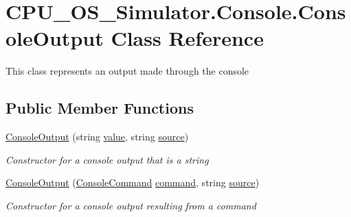 \hypertarget{class_c_p_u___o_s___simulator_1_1_console_1_1_console_output}{}\section{C\+P\+U\+\_\+\+O\+S\+\_\+\+Simulator.\+Console.\+Console\+Output Class Reference}
\label{class_c_p_u___o_s___simulator_1_1_console_1_1_console_output}


This class represents an output made through the console  


\subsection*{Public Member Functions}
\begin{DoxyCompactItemize}
\item 
\hyperlink{class_c_p_u___o_s___simulator_1_1_console_1_1_console_output_a8d641979b1d7dee40a2f4a4088f3779f}{Console\+Output} (string \hyperlink{class_c_p_u___o_s___simulator_1_1_console_1_1_console_output_a3bc577f947d51bc1b5c3880d5a7d5158}{value}, string \hyperlink{class_c_p_u___o_s___simulator_1_1_console_1_1_console_output_a3873d00cdb36068d1108fb012857504a}{source})
\begin{DoxyCompactList}\small\item\em Constructor for a console output that is a string \end{DoxyCompactList}\item 
\hyperlink{class_c_p_u___o_s___simulator_1_1_console_1_1_console_output_a26f0d6c6aa1f94d28171ee61c9ae4183}{Console\+Output} (\hyperlink{class_c_p_u___o_s___simulator_1_1_console_1_1_console_command}{Console\+Command} \hyperlink{class_c_p_u___o_s___simulator_1_1_console_1_1_console_output_aef6097d68fb3e2e83043c3857fdb8d56}{command}, string \hyperlink{class_c_p_u___o_s___simulator_1_1_console_1_1_console_output_a3873d00cdb36068d1108fb012857504a}{source})
\begin{DoxyCompactList}\small\item\em Constructor for a console output resulting from a command \end{DoxyCompactList}\end{DoxyCompactItemize}

